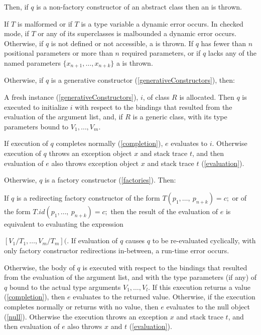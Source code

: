 \documentclass{article}
\begin{document}
\LMHash{}
Then, if $q$ is a non-factory constructor of an abstract class then an  is thrown.

\LMHash{}
If $T$ is malformed or if $T$ is a type variable a dynamic error occurs.
In checked mode, if $T$ or any of its superclasses is malbounded a dynamic error occurs.
Otherwise, if $q$ is not defined or not accessible, a  is thrown.
If $q$ has fewer than $n$ positional parameters or more than $n$ required parameters,
or if $q$ lacks any of the named parameters $\{ x_{n+1}, \ldots, x_{n+k}\}$ a  is thrown.

\LMHash{}
Otherwise, if $q$ is a generative constructor (\ref{generativeConstructors}), then:


\LMHash{}
A fresh instance (\ref{generativeConstructors}), $i$, of class $R$ is allocated.
Then $q$ is executed to initialize $i$ with respect to the bindings that resulted from the evaluation of the argument list, and, if $R$ is a generic class, with its type parameters bound to $V_1, \ldots, V_m$.

If execution of $q$ completes normally (\ref{completion}), $e$ evaluates to $i$.
Otherwise execution of $q$ throws an exception object $x$ and stack trace $t$,
and then evaluation of $e$ also throws exception object $x$ and stack trace $t$
(\ref{evaluation}).

\LMHash{}
Otherwise, $q$ is a factory constructor (\ref{factories}).
Then:

\LMHash{}
If $q$ is a redirecting factory constructor of the form $T(p_1, \ldots,\ p_{n+k}) = c;$ or of the form $T.id(p_1, \ldots,\ p_{n+k}) = c;$ then the result of the evaluation of $e$ is equivalent to evaluating the expression

$[V_1/T_1, \ldots, V_m/T_m]($.
If evaluation of $q$ causes $q$ to be re-evaluated cyclically, with only factory constructor redirections in-between, a run-time error occurs.

\LMHash{}
Otherwise, the body of $q$ is executed with respect to the bindings that resulted from the evaluation of the argument list, and with the type parameters (if any) of $q$ bound to the actual type arguments $V_1, \ldots, V_l$.
If this execution returns a value (\ref{completion}),
then $e$ evaluates to the returned value.
Otherwise, if the execution completes normally or returns with no value,
then $e$ evaluates to the null object (\ref{null}).
Otherwise the execution throws an exception $x$ and stack trace $t$,
and then evaluation of $e$ also throws $x$ and $t$ (\ref{evaluation}).
\end{document}
